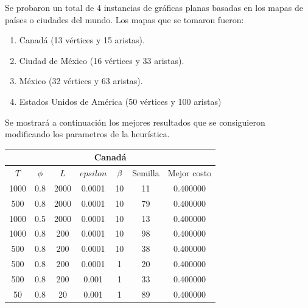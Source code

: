 \documentclass{article}
\begin{document}
  Se probaron un total de 4 instancias de gráficas planas basadas 
  en los mapas de países o ciudades del mundo. Los mapas que se tomaron
  fueron:

  \begin{enumerate}
    \item Canadá (13 vértices y 15 aristas).
    \item Ciudad de México (16 vértices y 33 aristas).
    \item México (32 vértices y 63 aristas).
    \item Estados Unidos de América (50 vértices y 100 aristas)
  \end{enumerate}

  Se mostrará a continuación los mejores resultados que se consiguieron
  modificando los parametros de la heurística.

  \begin{center}
    \begin{tabular}{|c|c|c|c|c|c|c|}
      \hline
      \multicolumn{7}{|c|}{Canadá}                                       \\
      \hline
      $T$  & $\phi$ & $L$  & $epsilon$ & $\beta$ & Semilla & Mejor costo \\
      1000 & 0.8    & 2000 & 0.0001    & 10      & 11      & 0.400000    \\
      500  & 0.8    & 2000 & 0.0001    & 10      & 79      & 0.400000    \\
      1000 & 0.5    & 2000 & 0.0001    & 10      & 13      & 0.400000    \\
      1000 & 0.8    & 200  & 0.0001    & 10      & 98      & 0.400000    \\
      500  & 0.8    & 200  & 0.0001    & 10      & 38      & 0.400000    \\
      500  & 0.8    & 200  & 0.0001    & 1       & 20      & 0.400000    \\
      500  & 0.8    & 200  & 0.001     & 1       & 33      & 0.400000    \\
      50   & 0.8    & 20   & 0.001     & 1       & 89      & 0.400000    \\
      \hline
    \end{tabular}
  \end{center}
\end{document}
